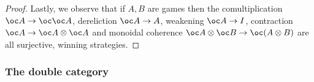 \documentclass{article}
\begin{document}
\begin{proof}
%
%
%
%

  Lastly, we observe that if $A,B$ are games then the comultiplication $\oc A \to \oc\oc A$, dereliction $\oc A \to A$, weakening $\oc A\to I$, contraction $\oc A \to \oc A \tensor \oc A$ and monoidal coherence $\oc A\tensor \oc B \to \oc (A\tensor B)$ are all surjective, winning strategies.
\end{proof}

\subsubsection{The double category \MonCat}
\end{document}
